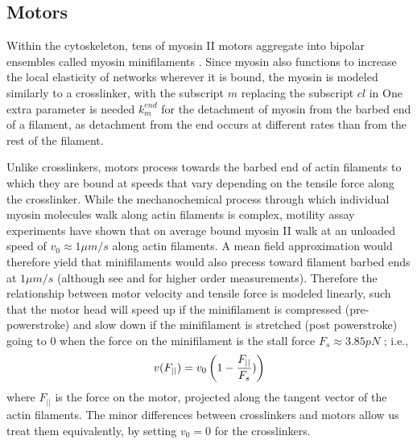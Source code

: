 \documentclass[12pt]{article}
\begin{document}
\subsection{Motors}\label{sec:methods_motors} 
Within the cytoskeleton, tens of myosin II motors aggregate into bipolar
ensembles called myosin minifilaments \cite{stam2015}.  
Since myosin also functions to increase the local elasticity of networks
wherever it is bound, the myosin is modeled similarly to a crosslinker, 
with the subscript $m$ replacing the subscript $cl$ in 
One extra parameter is needed $k_m^{end}$ for the detachment of myosin from the
barbed end of a filament, as detachment from the end occurs at different rates 
than from the rest of the filament. 
\par
Unlike crosslinkers, motors process towards the barbed end of actin filaments to which they are bound 
at speeds that vary depending on the tensile force along the crosslinker\cite{stam2015}.
While the mechanochemical process through which individual myosin molecules walk
along actin filaments is complex, motility assay experiments have shown that on
average bound myosin II walk at an unloaded speed of $v_0\approx1\mu m/s$
along actin filaments\cite{finer1994}. A mean field approximation would therefore yield
that minifilaments would also precess toward filament barbed ends at $1\mu m/s$
(although see \cite{stam2015} and \cite{walcott2012} for higher order measurements). 
Therefore the relationship between motor velocity and tensile force is modeled linearly, 
such that the motor head will speed up if the minifilament is compressed 
(pre-powerstroke) and slow down if the minifilament is stretched (post powerstroke) going to
$0$ when the force on the minifilament is the stall force $F_s\approx 3.85pN$ \cite{nedelec2002, gordon2012}; i.e.,  
\begin{equation} 
  v(F_{||}) = v_0\left( 1-{F_{||}\over F_s}) \right)
    \label{eqn:myo_vel}
\end{equation} 
where $F_{||}$ is the force on the motor, projected along the tangent vector of the
actin filaments.
The minor differences between crosslinkers and motors allow us treat them equivalently, by 
setting $v_0 = 0$ for the crosslinkers.  
\end{document}
